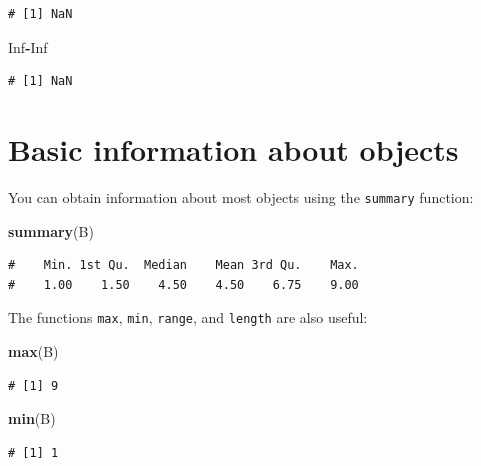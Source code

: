 \documentclass[
  a4paperpaper,
]{book}
\newenvironment{Shaded}{\begin{snugshade}}{\end{snugshade}}
\newcommand{\KeywordTok}[1]{\textcolor[rgb]{0.13,0.29,0.53}{\textbf{#1}}}
\newcommand{\NormalTok}[1]{#1}
\newcommand{\OperatorTok}[1]{\textcolor[rgb]{0.81,0.36,0.00}{\textbf{#1}}}
\newcommand{\OtherTok}[1]{\textcolor[rgb]{0.56,0.35,0.01}{#1}}
\begin{document}
\begin{verbatim}
# [1] NaN
\end{verbatim}

\begin{Shaded}
\begin{Highlighting}[]
\OtherTok{Inf}\OperatorTok{{-}}\OtherTok{Inf}
\end{Highlighting}
\end{Shaded}

\begin{verbatim}
# [1] NaN
\end{verbatim}

\hypertarget{basic-information-about-objects}{%
\section{Basic information about objects}\label{basic-information-about-objects}}

You can obtain information about most objects using the \texttt{summary} function:

\begin{Shaded}
\begin{Highlighting}[]
\KeywordTok{summary}\NormalTok{(B)}
\end{Highlighting}
\end{Shaded}

\begin{verbatim}
#    Min. 1st Qu.  Median    Mean 3rd Qu.    Max. 
#    1.00    1.50    4.50    4.50    6.75    9.00
\end{verbatim}

The functions \texttt{max}, \texttt{min}, \texttt{range}, and \texttt{length} are also useful:

\begin{Shaded}
\begin{Highlighting}[]
\KeywordTok{max}\NormalTok{(B)}
\end{Highlighting}
\end{Shaded}

\begin{verbatim}
# [1] 9
\end{verbatim}

\begin{Shaded}
\begin{Highlighting}[]
\KeywordTok{min}\NormalTok{(B)}
\end{Highlighting}
\end{Shaded}

\begin{verbatim}
# [1] 1
\end{verbatim}
\end{document}
